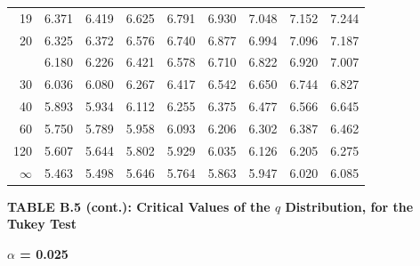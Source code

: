 \documentclass[10pt]{article}
\begin{document}
\begin{longtable}{@{}r!{\vrule width 0.8pt\hspace{0.55em}}rrrrrrrr@{}}
19 & 6.371 & 6.419 & 6.625 & 6.791 & 6.930 & 7.048 & 7.152 & 7.244 \\
20 & 6.325 & 6.372 & 6.576 & 6.740 & 6.877 & 6.994 & 7.096 & 7.187 \\
 & 6.180 & 6.226 & 6.421 & 6.578 & 6.710 & 6.822 & 6.920 & 7.007 \\
30 & 6.036 & 6.080 & 6.267 & 6.417 & 6.542 & 6.650 & 6.744 & 6.827 \\
40 & 5.893 & 5.934 & 6.112 & 6.255 & 6.375 & 6.477 & 6.566 & 6.645 \\
60 & 5.750 & 5.789 & 5.958 & 6.093 & 6.206 & 6.302 & 6.387 & 6.462 \\
120 & 5.607 & 5.644 & 5.802 & 5.929 & 6.035 & 6.126 & 6.205 & 6.275 \\
\addlinespace[0.30em]
$\infty$ & 5.463 & 5.498 & 5.646 & 5.764 & 5.863 & 5.947 & 6.020 & 6.085 \\
\end{longtable}
\newpage
\thispagestyle{empty}
\begin{center}
{\large\bfseries TABLE B.5 (cont.): Critical Values of the $q$ Distribution, for the Tukey Test\par}
\end{center}
{\large\bfseries $\alpha$ = 0.025\par}
\vspace{0.45em}
\small
\end{document}
